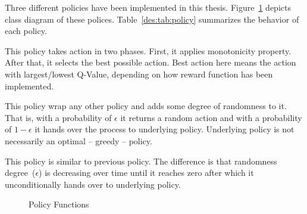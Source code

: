 Three different policies have been implemented in this thesis. Figure~\ref{des:f:policy} depicts class diagram of these polices. Table~\ref{des:tab:policy} summarizes the behavior of each policy.
\begin{description}[leftmargin=0pt]
    \item[Greedy Policy] This policy takes action in two phases. First, it applies monotonicity property. After that, it selects the best possible action. Best action here means the action with largest/lowest Q-Value, depending on how reward function has been implemented.
    \item[One Minus Epsilon Policy] This policy wrap any other policy and adds some degree of randomness to it. That is, with a probability of $\epsilon$ it returns a random action and with a probability of $1-\epsilon$ it hands over the process to underlying policy. Underlying policy is not necessarily an optimal -- greedy -- policy.
    \item[Decreasing One Minus Epsilon Policy] This policy is similar to previous policy. The difference is that randomness degree~($\epsilon$) is decreasing over time until it reaches zero after which it unconditionally hands over to underlying policy.
\end{description}
\begin{figure}[H]
    \centering
    \caption{Policy Functions}
    \label{des:f:policy}
\end{figure}
